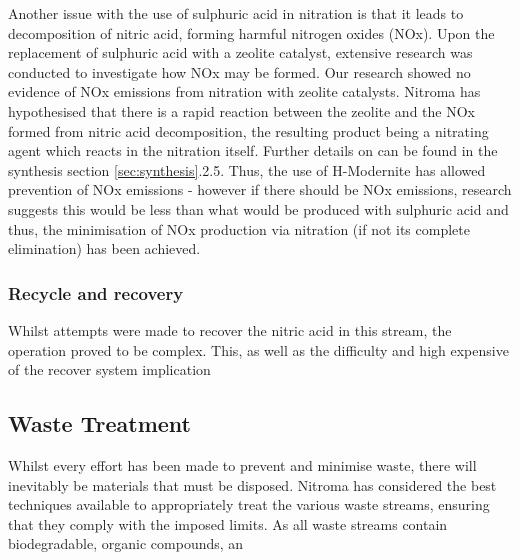 Another issue with the use of sulphuric acid in nitration is that it leads to decomposition of nitric acid, forming harmful nitrogen oxides (NOx). Upon the replacement of sulphuric acid with a zeolite catalyst, extensive research was conducted to investigate how NOx may be formed. Our research showed no evidence of NOx emissions from nitration with zeolite catalysts. Nitroma has hypothesised that there is a rapid reaction between the zeolite and the NOx formed from nitric acid decomposition, the resulting product being a nitrating agent which reacts in the nitration itself. Further details on can be found in the synthesis section \ref{sec:synthesis}.2.5. Thus, the use of H-Modernite has allowed prevention of NOx emissions - however if there should be NOx emissions, research suggests this would be less than what would be produced with sulphuric acid and thus, the minimisation of NOx production via nitration (if not its complete elimination) has been achieved.  

\subsubsection{Recycle and recovery}


 




Whilst attempts were made to recover the nitric acid in this stream, the operation proved to be complex. This, as well as the difficulty and high expensive of the recover system implication 



\subsection{Waste Treatment}

Whilst every effort has been made to prevent and minimise waste, there will inevitably be materials that must be disposed. Nitroma has considered the best techniques available to appropriately treat the various waste streams, ensuring that they comply with the imposed limits. As all waste streams contain biodegradable, organic compounds, an 

